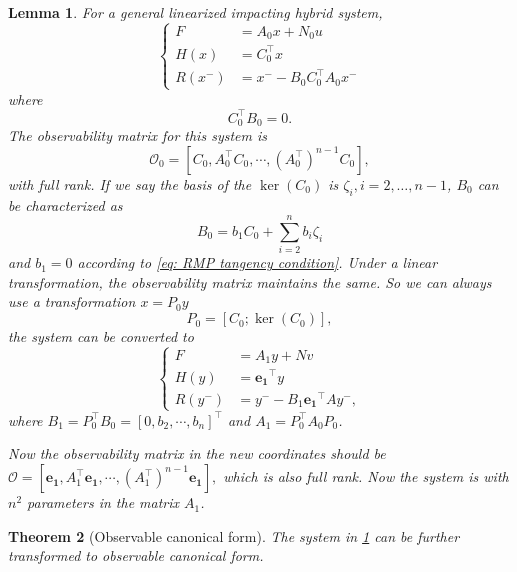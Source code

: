\documentclass{article}
\newtheorem{theorem}{Theorem}[section]
\newtheorem{lemma}[theorem]{Lemma}
\begin{document}
\begin{lemma}
	For a general linearized impacting hybrid system, 
	\begin{equation}
		\begin{cases}
			F  &= A_0 x + N_0 u \\
			H(x) &= C_0^{\top}x  \\
			R(x^-) &= x^- - B_0 C_0^{\top} A_0 x^-
		\end{cases}
	\end{equation}
where 
\begin{equation}
	C_0^{\top} B_0 =0.
	\label{eq: RMP tangency condition}
\end{equation}
The observability matrix for this system is 
\begin{equation}
	\mathcal{O}_0 = [C_0, A_0^{\top} C_0, \cdots , (A_0^{\top})^{n-1}C_0],
\end{equation}
with full rank.
%
If we say the basis of the $\operatorname{ker}(C_0)$ is $\zeta_i, i = 2,\dots,n-1$, $B_0$ can be characterized  as 
\[
 B_0  = b_1  C_0 + \sum_{i=2}^{n} b_i \zeta_i
\]
and $b_1=0$ according to \ref{eq: RMP tangency condition}.
Under a linear transformation, the observability matrix maintains the same. So we can always use a transformation $x = P_0 y$
\[
 P_0 = [C_0; \operatorname{ker}(C_0)],
\]
the system can be converted to 
\begin{equation}
	\begin{cases}
		F  &= A_1 y + N v  \\
		H(y) &= \mathbf{e_1}^{\top} y \\
		 R(y^-) &= y^- - B_1 \mathbf{e_1}^{\top} A y^- ,
	\end{cases}
\end{equation}
where $B_1 = P_0^{\top} B_0 = [0,b_2, \cdots, b_n]^{\top}$ and $A_1 = P_0^{\top} A_0 P_0$.

Now the observability matrix in the new coordinates should be 
$\mathcal{O} = [\mathbf{e_1}, A_1^{\top}\mathbf{e_1}, \cdots , (A_1^{\top})^{n-1}\mathbf{e_1}],$ which is also full rank.
Now the system is with $n^2$ parameters in the matrix $A_1$.

\label{lemma: observable system in stabdard basis}
\end{lemma}

\begin{theorem}[Observable canonical form]
	The system in \ref{lemma: observable system in stabdard basis} can be further transformed to observable canonical form.
	\label{th:OB_form_trans}
\end{theorem}
\end{document}
